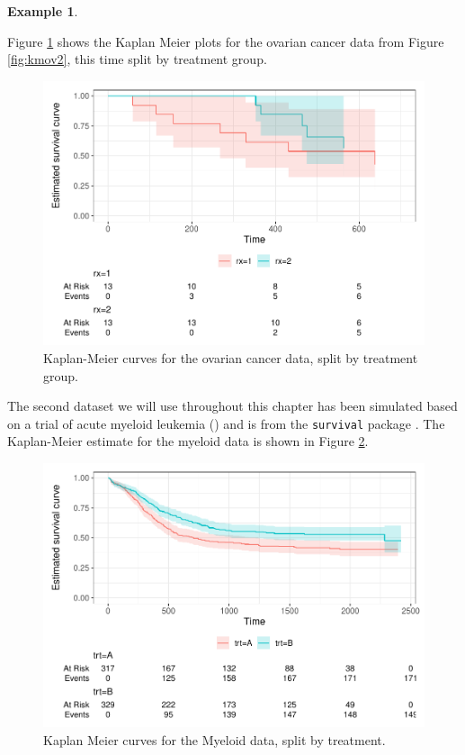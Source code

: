 \documentclass[
  openany]{book}
\theoremstyle{definition}
\theoremstyle{definition}
\newtheorem{example}{Example}[chapter]
\theoremstyle{definition}
\theoremstyle{definition}
\theoremstyle{remark}
\begin{document}
\begin{example}
\protect\hypertarget{exm:veteranmyeloid}{}\label{exm:veteranmyeloid}

Figure \ref{fig:ovarian} shows the Kaplan Meier plots for the ovarian cancer data from Figure \ref{fig:kmov2}, this time split by treatment group.

\begin{figure}
\centering
\includegraphics{CT4H_notes_files/figure-latex/ovarian-1.pdf}
\caption{\label{fig:ovarian}Kaplan-Meier curves for the ovarian cancer data, split by treatment group.}
\end{figure}

The second dataset we will use throughout this chapter has been simulated based on a trial of acute myeloid leukemia (\citet{le2018application}) and is from the \texttt{survival} package \citet{survival-package}. The Kaplan-Meier estimate for the myeloid data is shown in Figure \ref{fig:myeloid}.

\begin{figure}
\centering
\includegraphics{CT4H_notes_files/figure-latex/myeloid-1.pdf}
\caption{\label{fig:myeloid}Kaplan Meier curves for the Myeloid data, split by treatment.}
\end{figure}

\end{example}
\end{document}
